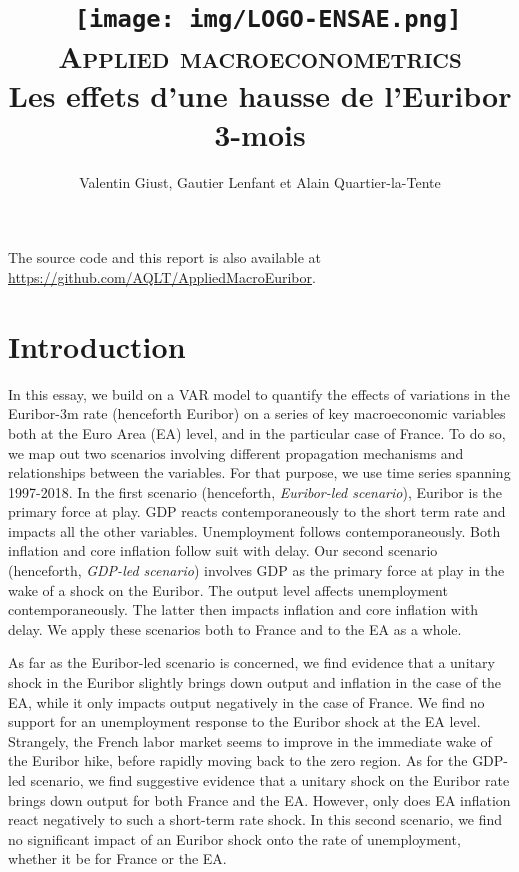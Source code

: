 \documentclass[
  11pt,
]{article}
\title{~\texttt{[image: img/LOGO-ENSAE.png]}\\
\hspace*{0.333em}\textsc{Applied macroeconometrics}\\
\hspace*{0.333em}Les effets d'une hausse de l'Euribor 3-mois}
\author{Valentin Giust, Gautier Lenfant et Alain Quartier-la-Tente}
\date{}
\begin{document}
\maketitle

{
\hypersetup{linkcolor=}
\setcounter{tocdepth}{2}
\tableofcontents
}
\vfill

The source code and this report is also available at \url{https://github.com/AQLT/AppliedMacroEuribor}.

\newpage

\hypertarget{introduction}{%
\section*{Introduction}\label{introduction}}

In this essay, we build on a VAR model to quantify the effects of variations in the Euribor-3m rate (henceforth Euribor) on a series of key macroeconomic variables both at the Euro Area (EA) level, and in the particular case of France. To do so, we map out two scenarios involving different propagation mechanisms and relationships between the variables. For that purpose, we use time series spanning 1997-2018. In the first scenario (henceforth, \emph{Euribor-led scenario}), Euribor is the primary force at play. GDP reacts contemporaneously to the short term rate and impacts all the other variables. Unemployment follows contemporaneously. Both inflation and core inflation follow suit with delay. Our second scenario (henceforth, \emph{GDP-led scenario}) involves GDP as the primary force at play in the wake of a shock on the Euribor. The output level affects unemployment contemporaneously. The latter then impacts inflation and core inflation with delay. We apply these scenarios both to France and to the EA as a whole.

As far as the Euribor-led scenario is concerned, we find evidence that a unitary shock in the Euribor slightly brings down output and inflation in the case of the EA, while it only impacts output negatively in the case of France. We find no support for an unemployment response to the Euribor shock at the EA level. Strangely, the French labor market seems to improve in the immediate wake of the Euribor hike, before rapidly moving back to the zero region. As for the GDP-led scenario, we find suggestive evidence that a unitary shock on the Euribor rate brings down output for both France and the EA. However, only does EA inflation react negatively to such a short-term rate shock. In this second scenario, we find no significant impact of an Euribor shock onto the rate of unemployment, whether it be for France or the EA.
\end{document}
